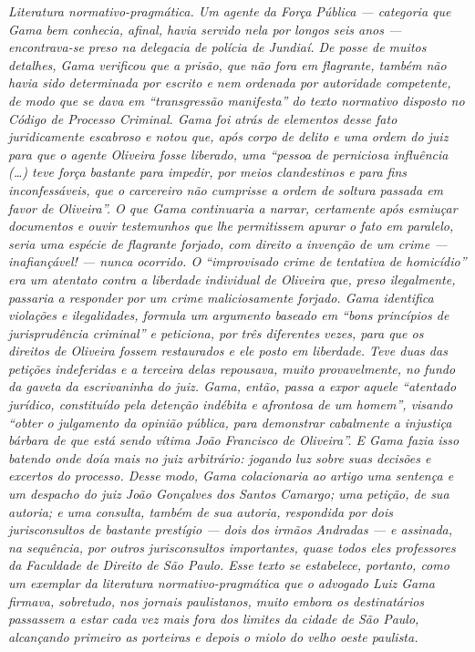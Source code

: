 \begin{didascalia}
\emph{Literatura normativo-pragmática. Um agente da Força Pública ---
categoria que Gama bem conhecia, afinal, havia servido nela por longos
seis anos --- encontrava-se preso na delegacia de polícia de Jundiaí. De
posse de muitos detalhes, Gama verificou que a prisão, que não fora em
flagrante, também não havia sido determinada por escrito e nem ordenada
por autoridade competente, de modo que se dava em ``transgressão
manifesta'' do texto normativo disposto no Código de Processo Criminal.
Gama foi atrás de elementos desse fato juridicamente escabroso e notou
que, após corpo de delito e uma ordem do juiz para que o agente Oliveira
fosse liberado, uma ``pessoa de perniciosa influência (\ldots{}) teve força
bastante para impedir, por meios clandestinos e para fins
inconfessáveis, que o carcereiro não cumprisse a ordem de soltura
passada em favor de Oliveira''. O que Gama continuaria a narrar,
certamente após esmiuçar documentos e ouvir testemunhos que lhe
permitissem apurar o fato em paralelo, seria uma espécie de flagrante
forjado, com direito a invenção de um crime --- inafiançável! --- nunca
ocorrido. O ``improvisado crime de tentativa de homicídio'' era um
atentato contra a liberdade individual de Oliveira que, preso
ilegalmente, passaria a responder por um crime maliciosamente forjado.
Gama identifica violações e ilegalidades, formula um argumento baseado
em ``bons princípios de jurisprudência criminal'' e peticiona, por três
diferentes vezes, para que os direitos de Oliveira fossem restaurados e
ele posto em liberdade. Teve duas das petições indeferidas e a terceira
delas repousava, muito provavelmente, no fundo da gaveta da escrivaninha
do juiz. Gama, então, passa a expor aquele ``atentado jurídico,
constituído pela detenção indébita e afrontosa de um homem'', visando
``obter o julgamento da opinião pública, para demonstrar cabalmente a
injustiça bárbara de que está sendo vítima João Francisco de Oliveira''.
E Gama fazia isso batendo onde doía mais no juiz arbitrário: jogando luz
sobre suas decisões e excertos do processo. Desse modo, Gama
colacionaria ao artigo uma sentença e um despacho do juiz João Gonçalves
dos Santos Camargo; uma petição, de sua autoria; e uma consulta, também
de sua autoria, respondida por dois jurisconsultos de bastante prestígio
--- dois dos irmãos Andradas --- e assinada, na sequência, por outros
jurisconsultos importantes, quase todos eles professores da Faculdade de
Direito de São Paulo. Esse texto se estabelece, portanto, como um
exemplar da literatura normativo-pragmática que o advogado Luiz Gama
firmava, sobretudo, nos jornais paulistanos, muito embora os
destinatários passassem a estar cada vez mais fora dos limites da cidade
de São Paulo, alcançando primeiro as porteiras e depois o miolo do velho
oeste paulista.}
\end{didascalia}


